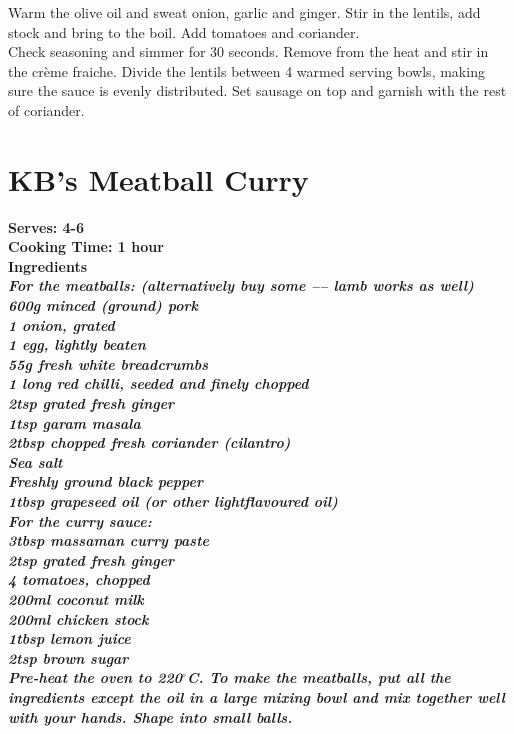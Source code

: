 \documentclass[18pt, oneside]{book}
\begin{document}
Warm the olive oil and sweat onion, garlic and ginger. Stir in the lentils, add stock and bring to the boil. Add tomatoes and coriander.\\ 

Check seasoning and simmer for 30 seconds. Remove from the heat and stir in the crème fraiche. Divide the lentils between 4 warmed serving bowls, making sure the sauce is evenly distributed. Set sausage on top and garnish with the rest of coriander.

\section{KB's Meatball Curry}

\bf{Serves: 4-6} \\
\bf{Cooking Time: 1 hour} \\

\bf{Ingredients} \normalfont \\

\it{For the meatballs}: \normalfont (alternatively buy some –-- lamb 
works as well) \\
600g minced (ground) pork \\
1 onion, grated \\
1 egg, lightly beaten \\
55g fresh white breadcrumbs \\
1 long red chilli, seeded and finely chopped \\
2tsp grated fresh ginger \\
1tsp garam masala \\
2tbsp chopped fresh coriander (cilantro) \\
Sea salt \\
Freshly ground black pepper \\
1tbsp grapeseed oil (or other lightflavoured oil) \\

\it{For the curry sauce}: \normalfont\\
3tbsp massaman curry paste \\
2tsp grated fresh ginger \\
4 tomatoes, chopped \\
200ml coconut milk \\
200ml chicken stock \\
1tbsp lemon juice \\
2tsp brown sugar \\

Pre-heat the oven to 220$^{\circ}$C. To make the meatballs, put all the ingredients except the oil in a large mixing bowl and mix together well with your hands. Shape into small balls. \\
\end{document}
